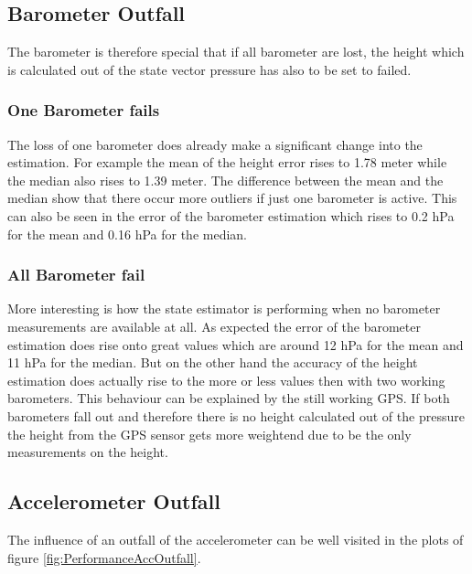 \subsection{Barometer Outfall}
The barometer is therefore special that if all barometer are lost, 
the height which is calculated out of the state vector pressure has also to be set to failed.

\subsubsection{One Barometer fails}
The loss of one barometer does already make a significant change into the estimation.
For example the mean of the height error rises to 1.78 meter while the median also rises to 1.39 meter.
The difference between the mean and the median show that there occur more outliers if just one barometer is active.
This can also be seen in the error of the barometer estimation which rises to 0.2 hPa for the mean and 0.16 hPa for the median.

\subsubsection{All Barometer fail}
More interesting is how the state estimator is performing when no barometer measurements are available at all.
As expected the error of the barometer estimation does rise onto great values which are around 12 hPa for the mean and 11 hPa for the median.
But on the other hand the accuracy of the height estimation does actually rise to the more or less values then with two working barometers.
This behaviour can be explained by the still working GPS.
If both barometers fall out and therefore there is no height calculated out of the pressure the height from the 
GPS sensor gets more weightend due to be the only measurements on the height.

\newpage
\subsection{Accelerometer Outfall}
The influence of an outfall of the accelerometer can be well visited in the plots of figure \ref{fig:PerformanceAccOutfall}.

